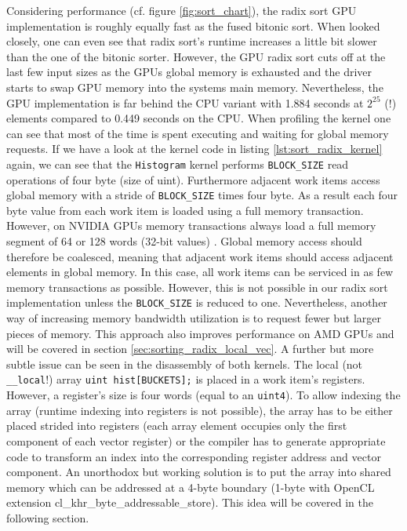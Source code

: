 Considering performance (cf. figure \ref{fig:sort_chart}), the radix sort GPU implementation is roughly equally fast as the fused bitonic sort. When looked closely, one can even see that radix sort's runtime increases a little bit slower than the one of the bitonic sorter. However, the GPU radix sort cuts off at the last few input sizes as the GPUs global memory is exhausted and the driver starts to swap GPU memory into the systems main memory. Nevertheless, the GPU implementation is far behind the CPU variant with 1.884 seconds at $2^{25}$ (!) elements compared to 0.449 seconds on the CPU.
When profiling the kernel one can see that most of the time is spent executing and waiting for global memory requests. If we have a look at the kernel code in listing \ref{lst:sort_radix_kernel} again, we can see that the \lstinline!Histogram! kernel performs \lstinline!BLOCK_SIZE! read operations of four byte (size of uint). Furthermore adjacent work items access global memory with a stride of \lstinline!BLOCK_SIZE! times four byte. As a result each four byte value from each work item is loaded using a full memory transaction. However, on NVIDIA GPUs memory transactions always load a full memory segment of 64 or 128 words (32-bit values) \cite[p.13]{nvidia_opencl_best_practices}. Global memory access should therefore be coalesced, meaning that adjacent work items should access adjacent elements in global memory. In this case, all work items can be serviced in as few memory transactions as possible. However, this is not possible in our radix sort implementation unless the \lstinline!BLOCK_SIZE! is reduced to one. Nevertheless, another way of increasing memory bandwidth utilization is to request fewer but larger pieces of memory. This approach also improves performance on AMD GPUs and will be covered in section \ref{sec:sorting_radix_local_vec}.
A further but more subtle issue can be seen in the disassembly of both kernels. The local (not \lstinline!__local!!) array \lstinline!uint hist[BUCKETS];! is placed in a work item's registers. However, a register's size is four words (equal to an \lstinline!uint4!). To allow indexing the array (runtime indexing into registers is not possible), the array has to be either placed strided into registers (each array element occupies only the first component of each vector register) or the compiler has to generate appropriate code to transform an index into the corresponding register address and vector component. An unorthodox but working solution is to put the array into shared memory which can be addressed at a 4-byte boundary (1-byte with OpenCL extension cl\_khr\_byte\_addressable\_store). This idea will be covered in the following section.

